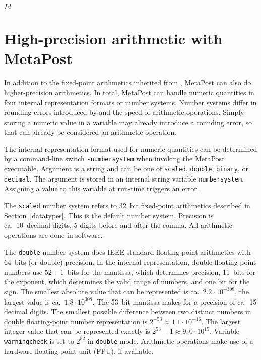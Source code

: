 \svnInfo $Id$
\section{High-precision arithmetic with MetaPost}
\label{hparith}

In addition to the fixed-point arithmetics inherited from \MF, MetaPost
can also do higher-precision arithmetics.  In total, MetaPost can handle
numeric quantities in four internal representation formats or number
systems.  Number systems differ in rounding errors
introduced by and the speed of arithmetic operations.  Simply storing a
numeric value in a variable may already introduce a rounding error, so
that can already be considered an arithmetic operation.

The internal representation format used for numeric quantities can be
determined by a command-line switch
\texttt{-numbersystem}
when invoking the MetaPost executable.  Argument is a string and can be
one of \texttt{scaled}, \texttt{double}, \texttt{binary}, or
\texttt{decimal}.  The argument is stored in an internal string variable
\texttt{numbersystem}\label{Dnumbersystem}.
Assigning a value to this variable at run-time triggers an error.

The \texttt{scaled} number system refers
to 32~bit fixed-point arithmetics described in Section~\ref{datatypes}.
This is the default number system.  Precision is ca.~10~decimal digits,
5 digits before and after the comma.  All arithmetic operations are done
in software.

The \texttt{double} number system does
IEEE standard floating-point arithmetics with 64~bits (or double)
precision.  In the internal representation, double floating-point
numbers use $52+1$~bits for the mantissa, which determines precision,
11~bits for the exponent, which determines the valid range of numbers,
and one bit for the sign.  The smallest absolute value that can be
represented is ca.~$2.2\cdot10^{-308}$, the largest value is
ca.~$1.8\cdot10^{308}$.  The 53~bit mantissa makes for a precision of
ca.~15 decimal digits.  The smallest possible difference between two
distinct numbers in double floating-point number representation is
$2^{-53} \approx 1.1\cdot10^{-16}$.  The largest integer value that can
be represented exactly is $2^{53}-1 \approx 9,0\cdot10^{15}$.  Variable
\texttt{warningcheck} is set
to $2^{52}$ in \texttt{double} mode.  Arithmetic operations make use of
a hardware floating-point unit (FPU), if available.


